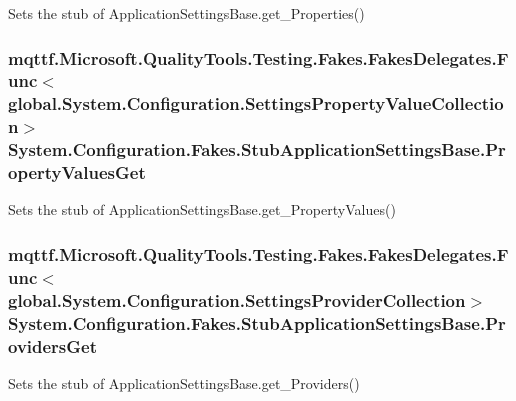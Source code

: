 Sets the stub of Application\-Settings\-Base.\-get\-\_\-\-Properties()

\hypertarget{class_system_1_1_configuration_1_1_fakes_1_1_stub_application_settings_base_a4f53c7bba92d95314b2b8ca26dc27421}{
\subsubsection[{Property\-Values\-Get}]{\setlength{\rightskip}{0pt plus 5cm}mqttf.\-Microsoft.\-Quality\-Tools.\-Testing.\-Fakes.\-Fakes\-Delegates.\-Func$<$global.\-System.\-Configuration.\-Settings\-Property\-Value\-Collection$>$ System.\-Configuration.\-Fakes.\-Stub\-Application\-Settings\-Base.\-Property\-Values\-Get}}\label{class_system_1_1_configuration_1_1_fakes_1_1_stub_application_settings_base_a4f53c7bba92d95314b2b8ca26dc27421}


Sets the stub of Application\-Settings\-Base.\-get\-\_\-\-Property\-Values()

\hypertarget{class_system_1_1_configuration_1_1_fakes_1_1_stub_application_settings_base_a6f05ab3ee8bbd4d13825fbd319e11e18}{
\subsubsection[{Providers\-Get}]{\setlength{\rightskip}{0pt plus 5cm}mqttf.\-Microsoft.\-Quality\-Tools.\-Testing.\-Fakes.\-Fakes\-Delegates.\-Func$<$global.\-System.\-Configuration.\-Settings\-Provider\-Collection$>$ System.\-Configuration.\-Fakes.\-Stub\-Application\-Settings\-Base.\-Providers\-Get}}\label{class_system_1_1_configuration_1_1_fakes_1_1_stub_application_settings_base_a6f05ab3ee8bbd4d13825fbd319e11e18}


Sets the stub of Application\-Settings\-Base.\-get\-\_\-\-Providers()


